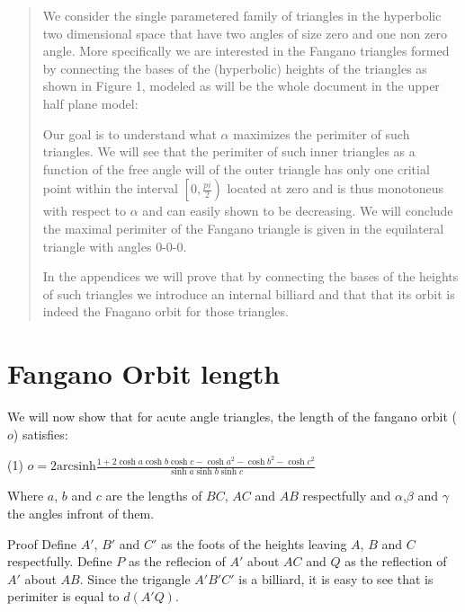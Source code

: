 \documentclass[a4paper,10pt]{article}
\title{}
\author{}
\newcommand{\arcsinh}{\ensuremath{\mathrm{arcsinh}}}
\begin{document}
\maketitle
\begin{abstract}

We consider the single parametered family of triangles in the hyperbolic two 
dimensional space that have two angles of size zero and one non zero angle.
More specifically we are interested in the Fangano triangles formed by connecting 
the bases of the (hyperbolic) heights of the triangles as shown in Figure 1, 
modeled as will be the whole document in the upper half plane model:


Our goal is to understand what $\alpha$ maximizes the perimiter of such triangles.
We will see that the perimiter of such inner triangles as a function of the free
angle will of the outer triangle has only one critial point within
the interval $\left[0,\frac{pi}{2}\right)$ located at zero and is thus monotoneus
with respect to $\alpha$ and can easily shown to be decreasing. We will conclude
the maximal perimiter of the Fangano triangle is given in the equilateral
triangle with angles 0-0-0.

In the appendices we will prove that by connecting the bases of the heights of
such triangles we introduce an internal billiard and that that its orbit is indeed
the Fnagano orbit for those triangles.

\end{abstract}
\section{Fangano Orbit length}

We will now show that for acute angle triangles, the length of the fangano orbit
($o$) satisfies:

\begin{center}
(1) $o = 2\arcsinh{\frac{1+2\cosh{a}\cosh{b}\cosh{c}-\cosh{a}^2-\cosh{b}^2-\cosh{c}^2}{\sinh{a}\sinh{b}\sinh{c}}}$
\end{center}

Where $a$, $b$ and $c$ are the lengths of $BC$, $AC$ and $AB$ respectfully and
$\alpha$,$\beta$ and $\gamma$ the angles infront of them.


Proof
Define $A'$, $B'$ and $C'$ as the foots of the heights leaving $A$, $B$ and $C$
respectfully. Define $P$ as the reflecion of $A'$ about $AC$ and $Q$ as the
reflection of $A'$ about $AB$. Since the trigangle $A'B'C'$ is a billiard, it is
easy to see that is perimiter is equal to $d\left(A' Q\right)$.
\end{document}
